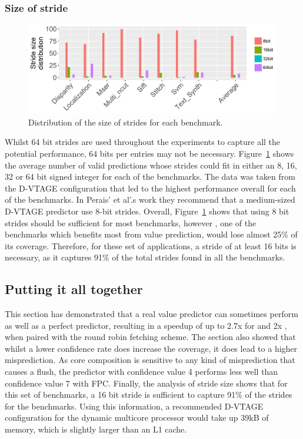 \subsubsection{Size of stride}

\begin{figure}[t]
    \centering
    \includegraphics[width=1\textwidth]{chapter3/graphics/strides.pdf}
    \caption{Distribution of the size of strides for each benchmark.}
    \label{fig:strides}
	\vspace{1em}
\end{figure}

Whilst 64 bit strides are used throughout the experiments to capture all the potential performance, 64 bits per entries may not be necessary.
Figure~\ref{fig:strides} shows the average number of valid predictions whose strides could fit in either an 8, 16, 32 or 64 bit signed integer for each of the benchmarks.
The data was taken from the D-VTAGE configuration that led to the highest performance overall for each of the benchmarks.
In Perais' et al'.s work they recommend that a medium-sized D-VTAGE predictor use 8-bit strides.
Overall, Figure~\ref{fig:strides} shows that using 8 bit strides should be sufficient for most benchmarks, however , one of the benchmarks which benefits most from value prediction, would lose almost 25\% of its coverage.
Therefore, for these set of applications, a stride of at least 16 bits is necessary, as it captures 91\% of the total strides found in all the benchmarks.

\subsection{Putting it all together}
This section has demonstrated that a real value predictor can sometimes perform as well as a perfect predictor, resulting in a speedup of up to 2.7x for  and 2x , when paired with the round robin fetching scheme.
The section also showed that whilst a lower confidence rate does increase the coverage, it does lead to a higher misprediction.
As core composition is sensitive to any kind of misprediction that causes a flush, the predictor with confidence value 4 performs less well than confidence value 7 with FPC.
Finally, the analysis of stride size shows that for this set of benchmarks, a 16 bit stride is sufficient to capture 91\% of the strides for the benchmarks.
Using this information, a recommended D-VTAGE configuration for the dynamic multicore processor would take up 39kB of memory, which is slightly larger than an L1 cache.
